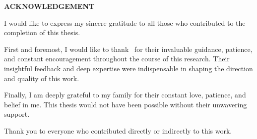 \thispagestyle{plain}

\begin{center}
  {\fontsize{16}{22}\selectfont\bfseries ACKNOWLEDGEMENT}
\end{center}

\noindent
I would like to express my sincere gratitude to all those who
contributed to the completion of this thesis.

\bigskip
\noindent
First and foremost, I would like to thank \SupervisorName\ for
their invaluable guidance, patience, and constant encouragement
throughout the course of this research. Their insightful feedback
and deep expertise were indispensable in shaping the direction and
quality of this work.

\bigskip
\noindent
Finally, I am deeply grateful to my family for their constant
love, patience, and belief in me. This thesis would not have been
possible without their unwavering support.

\bigskip
\noindent
Thank you to everyone who contributed directly or indirectly to
this work.

\clearpage

